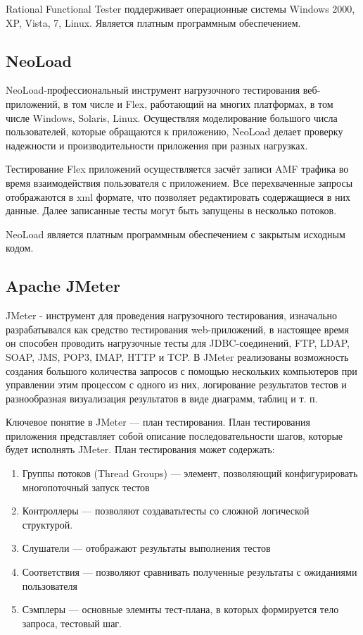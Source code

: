 Rational Functional Tester поддерживает операционные системы Windows 
2000, XP, Vista, 7, Linux. Является платным программным обеспечением.

\subsection*{NeoLoad}

NeoLoad-профессиональный инструмент нагрузочного тестирования веб-приложений, 
в том числе и Flex, работающий на многих платформах, в том числе Windows, Solaris, Linux.
Осуществляя моделирование большого числа пользователей, которые обращаются 
к приложению, NeoLoad делает проверку надежности и производительности 
приложения при разных нагрузках.

Тестирование Flex приложений осуществляется засчёт записи AMF трафика во 
время взаимодействия пользователя с приложением. Все перехваченные запросы 
отображаются в xml формате, что позволяет редактировать содержащиеся в них 
данные. Далее записанные тесты могут быть запущены в несколько потоков.

NeoLoad является платным программным обеспечением с закрытым исходным кодом. 
 
\subsection*{Apache JMeter}

JMeter - инструмент для проведения нагрузочного тестирования, изначально 
разрабатывался как средство тестирования web-приложений, в настоящее время 
он способен проводить нагрузочные тесты для JDBC-соединений, FTP, LDAP, SOAP, 
JMS, POP3, IMAP, HTTP и TCP. 
В JMeter реализованы возможность создания большого количества запросов с 
помощью нескольких компьютеров при управлении этим процессом с одного из них,
логирование результатов тестов и разнообразная визуализация результатов в
виде диаграмм, таблиц и т. п.

Ключевое понятие в JMeter –-- план тестирования. План тестирования приложения
представляет собой описание последовательности шагов, которые
будет исполнять JMeter. План тестирования может содержать:

\begin{enumerate}
\item Группы потоков (Thread Groups) --- элемент, позволяющий конфигурировать
многопоточный запуск тестов
\item Контроллеры --- позволяют создаватьтесты со сложной логической структурой.
\item Слушатели --- отображают результаты выполнения тестов
\item Соответствия --- позволяют сравнивать полученные результаты с
ожиданиями пользователя
\item Сэмплеры --- основные элемнты тест-плана, в которых формируется тело
запроса, тестовый шаг.
\end{enumerate}

